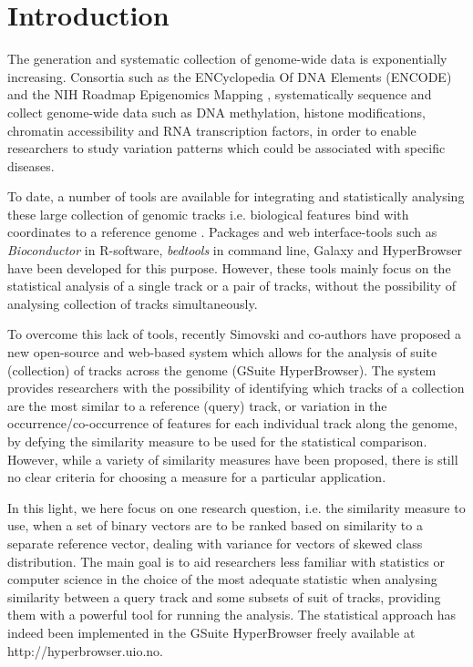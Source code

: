 \documentclass{bioinfo}
\begin{document}
\section{Introduction}
\label{intro}
The generation and systematic collection of genome-wide data is exponentially increasing. Consortia such as the ENCyclopedia Of DNA Elements (ENCODE)  \cite{encode2012integrated} and the NIH Roadmap Epigenomics Mapping \cite{kundaje2015integrative}, systematically sequence and collect genome-wide data such as DNA methylation, histone modifications, chromatin accessibility and RNA transcription factors, in order to enable researchers to study variation patterns which could be associated with specific diseases. \par
To date, a number of tools are available for integrating and statistically analysing these large collection of genomic tracks i.e. biological features bind with coordinates to a reference genome \cite{gundersen2011identifying,rosenbloom2013encode,sandve2010genomic}. Packages and web interface-tools such as \textit{Bioconductor} \cite{huber2015orchestrating} in R-software, \textit{bedtools} \cite{quinlan2010bedtools} in command line, Galaxy \cite{goecks2010galaxy} and HyperBrowser \cite{sandve2013genomic} have been developed for this purpose. However, these tools mainly focus on the statistical analysis of a single track or a pair of tracks, without the possibility of analysing collection of tracks simultaneously. \par
To overcome this lack of tools, recently Simovski and co-authors \cite{simovski2017gsuite} have proposed a new open-source and web-based system which allows for the analysis of suite (collection) of tracks across the genome (GSuite HyperBrowser). The system provides researchers with the possibility of identifying which tracks of a collection are the most similar to a reference (query) track, or variation in the occurrence/co-occurrence of features for each individual track along the genome, by defying the similarity measure to be used for the statistical comparison. However, while a variety of similarity measures have been proposed, there is still no clear criteria for choosing a measure for a particular application. 

\par 
In this light, we here focus on one research question, i.e. the similarity measure to use, when a set of binary vectors are to be ranked based on similarity to a separate reference vector, dealing with variance for vectors of skewed class distribution. The main goal is to aid researchers less familiar with statistics or computer science in the choice of the most adequate statistic when analysing similarity between a query track and some subsets of suit of tracks, providing them with a powerful tool for running the analysis. The statistical approach has indeed been implemented in the GSuite HyperBrowser freely available at http://hyperbrowser.uio.no.
\end{document}
